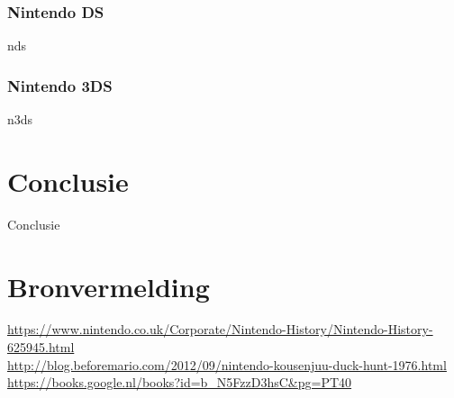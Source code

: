 \documentclass{article}
\begin{document}
\subsubsection{Nintendo DS}
nds
\subsubsection{Nintendo 3DS}
n3ds
\section{Conclusie}
Conclusie
\section{Bronvermelding}
\url{https://www.nintendo.co.uk/Corporate/Nintendo-History/Nintendo-History-625945.html}\\ 
\url{http://blog.beforemario.com/2012/09/nintendo-kousenjuu-duck-hunt-1976.html}\\ 
\url{https://books.google.nl/books?id=b_N5FzzD3hsC&pg=PT40}\\ 
\end{document}
